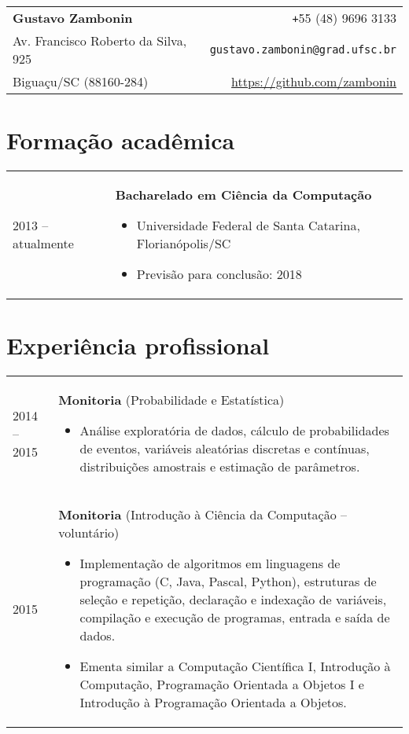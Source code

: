 \documentclass[11pt]{article}
\makeatletter
\newenvironment{headertable}{
    \hspace{-0.9cm}
    \begin{tabular*}{20.1cm}{l@{\extracolsep{\fill}}r}
}{
    \end{tabular*}
}
\newenvironment{contenttable}{
    \newcolumntype{L}{>{\bf \raggedleft}p{0.13\textwidth}}
    \newcolumntype{R}{p{0.84\textwidth}}
    \begin{tabular}{L!{\color{lightgray} \vrule}R}
}{
    \end{tabular}
}
\newenvironment{smallitem}{
    \vspace{-2mm}
    \begin{itemize}
    \setlength{\parskip}{0pt}
    \setlength{\itemsep}{2pt}
}{
    \vspace{-4mm} \end{itemize}
}
\newcommand{\customsec}[1]{\vspace{-4mm} \section*{#1}}
\makeatother
\begin{document}
\begin{headertable}
\bf \Large Gustavo Zambonin         & \texttt{+}55 (48) 9696 3133            \\
Av. Francisco Roberto da Silva, 925 & \texttt{gustavo.zambonin@grad.ufsc.br} \\
Biguaçu/SC (88160-284)              & \url{https://github.com/zambonin}      \\
\end{headertable}

\customsec{Formação acadêmica}
\begin{contenttable}
    2013 -- atualmente & \textbf{Bacharelado em Ciência da Computação}
    \begin{smallitem}
        \item Universidade Federal de Santa Catarina, Florianópolis/SC
        \item Previsão para conclusão: 2018
    \end{smallitem}
\end{contenttable}

\customsec{Experiência profissional}
\begin{contenttable}
    2014 -- 2015 & \textbf{Monitoria} (Probabilidade e Estatística)
    \begin{smallitem}
        \item Análise exploratória de dados, cálculo de probabilidades de
        eventos, variáveis aleatórias discretas e contínuas, distribuições
        amostrais e estimação de parâmetros.
    \end{smallitem} \\

    2015 & \textbf{Monitoria} (Introdução à Ciência da Computação -- voluntário)
    \begin{smallitem}
        \item Implementação de algoritmos em linguagens de programação (C,
        Java, Pascal, Python), estruturas de seleção e repetição, declaração e
        indexação de variáveis, compilação e execução de programas, entrada e
        saída de dados.
        \item Ementa similar a Computação Científica I, Introdução à
        Computação, Programação Orientada a Objetos I e Introdução à
        Programação Orientada a Objetos.
    \end{smallitem}
\end{contenttable}
\end{document}
